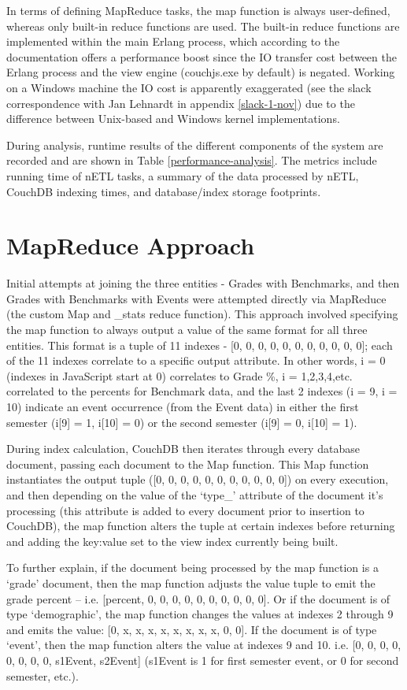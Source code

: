 In terms of defining MapReduce tasks, the map function is always user-defined, whereas only built-in reduce functions are used. The built-in reduce functions are implemented within the main Erlang process, which according to the documentation offers a performance boost since the IO transfer cost between the Erlang process and the view engine (couchjs.exe by default) is negated. Working on a Windows machine the IO cost is apparently exaggerated (see the slack correspondence with Jan Lehnardt in appendix \ref{slack-1-nov}) due to the difference between Unix-based and Windows kernel implementations.

During analysis, runtime results of the different components of the system are recorded and are shown in Table \ref{performance-analysis}. The metrics include running time of nETL tasks, a summary of the data processed by nETL, CouchDB indexing times, and database/index storage footprints.

\section{MapReduce Approach}
Initial attempts at joining the three entities - Grades with Benchmarks, and then Grades with Benchmarks with Events were attempted directly via MapReduce (the custom Map and \_stats reduce function). This approach involved specifying the map function to always output a value of the same format for all three entities. This format is a tuple of 11 indexes - [0, 0, 0, 0, 0, 0, 0, 0, 0, 0, 0]; each of the 11 indexes correlate to a specific output attribute. In other words, i = 0 (indexes in JavaScript start at 0) correlates to Grade \%, i = 1,2,3,4,etc. correlated to the percents for Benchmark data, and the last 2 indexes (i = 9, i = 10) indicate an event occurrence (from the Event data) in either the first semester (i[9] = 1, i[10] = 0) or the second semester (i[9] = 0, i[10] = 1).

During index calculation, CouchDB then iterates through every database document, passing each document to the Map function. This Map function instantiates the output tuple ([0, 0, 0, 0, 0, 0, 0, 0, 0, 0, 0]) on every execution, and then depending on the value of the `type\_' attribute of the document it's processing (this attribute is added to every document prior to insertion to CouchDB), the map function alters the tuple at certain indexes before returning and adding the key:value set to the view index currently being built.

To further explain, if the document being processed by the map function is a ‘grade’ document, then the map function adjusts the value tuple to emit the grade percent – i.e. [percent, 0, 0, 0, 0, 0, 0, 0, 0, 0, 0]. Or if the document is of type ‘demographic’, the map function changes the values at indexes 2 through 9 and emits the value: [0, x, x, x, x, x, x, x, x, 0, 0]. If the document is of type ‘event’, then the map function alters the value at indexes 9 and 10. i.e. [0, 0, 0, 0, 0, 0, 0, 0, s1Event, s2Event] (s1Event is 1 for first semester event, or 0 for second semester, etc.).

